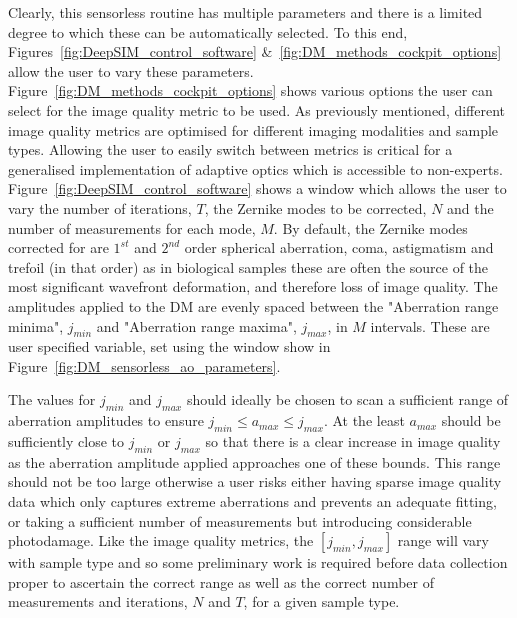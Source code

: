 Clearly, this sensorless routine has multiple parameters and there is a limited degree to which these can be automatically selected. To this end, Figures~\ref{fig:DeepSIM_control_software} \&~\ref{fig:DM_methods_cockpit_options} allow the user to vary these parameters. Figure~\ref{fig:DM_methods_cockpit_options} shows various options the user can select for the image quality metric to be used. As previously mentioned, different image quality metrics are optimised for different imaging modalities and sample types. Allowing the user to easily switch between metrics is critical for a generalised implementation of adaptive optics which is accessible to non-experts. Figure~\ref{fig:DeepSIM_control_software} shows a window which allows the user to vary the number of iterations, $T$, the Zernike modes to be corrected, $N$ and the number of measurements for each mode, $M$. By default, the Zernike modes corrected for are $1^{st}$ and $2^{nd}$ order spherical aberration, coma, astigmatism and trefoil (in that order) as in biological samples these are often the source of the most significant wavefront deformation, and therefore loss of image quality. The amplitudes applied to the DM are evenly spaced between the "Aberration range minima", $j_{min}$ and "Aberration range maxima", $j_{max}$, in $M$ intervals. These are user specified variable, set using the window show in Figure~\ref{fig:DM_sensorless_ao_parameters}. 

The values for $j_{min}$ and $j_{max}$ should ideally be chosen to scan a sufficient range of aberration amplitudes to ensure $j_{min} \le a_{max} \le j_{max}$. At the least $a_{max}$ should be sufficiently close to $j_{min}$ or $j_{max}$ so that there is a clear increase in image quality as the aberration amplitude applied approaches one of these bounds. This range should not be too large otherwise a user risks either having sparse image quality data which only captures extreme aberrations and prevents an adequate fitting, or taking a sufficient number of measurements but introducing considerable photodamage. Like the image quality metrics, the $[j_{min},j_{max}]$ range will vary with sample type and so some preliminary work is required before data collection proper to ascertain the correct range as well as the correct number of measurements and iterations, $N$ and $T$, for a given sample type. 

